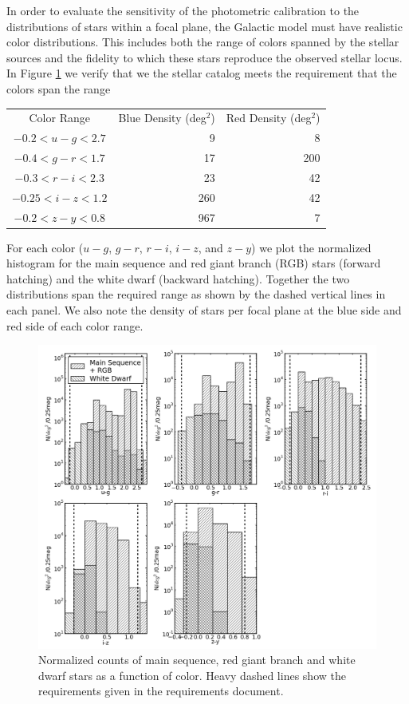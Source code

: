 \documentclass[]{article}
\begin{document}
In order to evaluate the sensitivity of the photometric calibration to
the distributions of stars within a focal plane, the Galactic model
must have realistic color distributions.  This includes both the range
of colors spanned by the stellar sources and the fidelity to which
these stars reproduce the observed stellar locus. In Figure
\ref{fig:starcolorspan} we verify that we the stellar catalog meets
the requirement that the colors span the range
\begin{center}
\begin{tabular}{c|r|r}
Color Range& Blue Density (deg$^2$) & Red Density (deg$^2$)\\
      $ -0.2 < u-g <        2.7 $&9&8\\
       $  -0.4  <  g-r <       1.7 $&17&200\\
        $ -0.3   <  r-i <    2.3 $&23&42\\
        $  -0.25 < i-z <       1.2 $&260&42\\ 
        $  -0.2 <  z-y   <    0.8 $&967&7
\end{tabular}
\end{center}
For each color ($u-g$, $g-r$, $r-i$,
$i-z$, and $z-y$) we plot the normalized histogram for the main
sequence and red giant branch (RGB) stars (forward hatching) and the
white dwarf (backward hatching).  Together the two distributions span
the required range as shown by the dashed vertical lines in each
panel.  We also note the density of stars per focal plane at the blue
side and red side of each color range.
\begin{figure}[H]
\centering
\includegraphics[width=5in]{validation_figures/star_lsst_color_hist.png}
\caption{Normalized counts of main sequence, red giant branch and white dwarf stars as a function of color.  Heavy dashed lines show the requirements given in the requirements document.\label{fig:starcolorspan}}
\end{figure}
\end{document}
